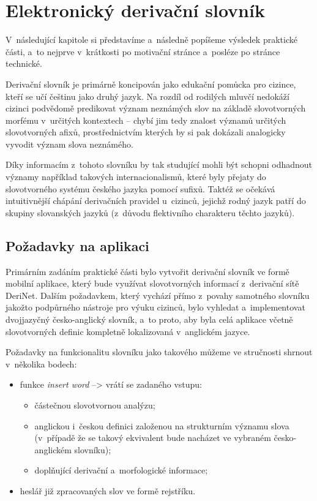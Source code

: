 \hypertarget{elektronickuxfd-derivaux10dnuxed-slovnuxedk}{%
\chapter{Elektronický derivační
slovník}\label{elektronickuxfd-derivaux10dnuxed-slovnuxedk}}

V~následující kapitole si představíme a~následně popíšeme výsledek
praktické části, a~to nejprve v~krátkosti po motivační stránce a~posléze
po stránce technické.

Derivační slovník je primárně koncipován jako edukační pomůcka pro
cizince, kteří se učí češtinu jako druhý jazyk. Na rozdíl od rodilých
mluvčí nedokáží cizinci podvědomě predikovat význam neznámých slov na
základě slovotvorných morfému v~určitých kontextech -- chybí jim tedy
znalost významů určitých slovotvorných afixů, prostřednictvím kterých by
si pak dokázali analogicky vyvodit význam slova neznámého.

Díky informacím z~tohoto slovníku by tak studující mohli být schopni
odhadnout významy například takových internacionalismů, které byly
přejaty do slovotvorného systému českého jazyka pomocí sufixů. Taktéž se
očekává intuitivnější chápání derivačních pravidel u~cizinců, jejichž
rodný jazyk patří do skupiny slovanských jazyků (z~důvodu flektivního
charakteru těchto jazyků).

\hypertarget{poux17eadavky-na-aplikaci}{%
\section{Požadavky na aplikaci}\label{poux17eadavky-na-aplikaci}}

Primárním zadáním praktické části bylo vytvořit derivační slovník ve
formě mobilní aplikace, který bude využívat slovotvorných informací
z~derivační sítě DeriNet. Dalším požadavkem, který vychází přímo z~povahy
samotného slovníku jakožto podpůrného nástroje pro výuku cizinců, bylo
vyhledat a~implementovat dvojjazyčný česko-anglický slovník, a~to proto,
aby byla celá aplikace včetně slovotvorných definic kompletně
lokalizovaná v~anglickém jazyce.

Požadavky na funkcionalitu slovníku jako takového můžeme ve stručnosti
shrnout v~několika bodech:

\begin{itemize}
\tightlist
\item
  funkce \emph{insert word} --\textgreater{} vrátí se zadaného vstupu:

  \begin{itemize}
  \tightlist
  \item
    částečnou slovotvornou analýzu;
  \item
    anglickou i~českou definici založenou na strukturním významu slova
    (v~případě že se takový ekvivalent bude nacházet ve vybraném
    česko-anglickém slovníku);
  \item
    doplňující derivační a~morfologické informace;
  \end{itemize}
\item
  heslář již zpracovaných slov ve formě rejstříku.
\end{itemize}

